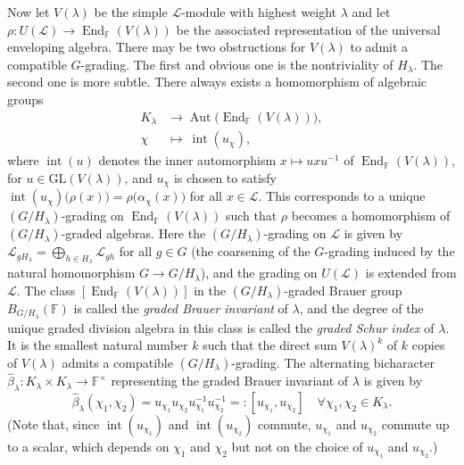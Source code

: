 \documentclass[a4paper,reqno]{amsart}
\theoremstyle{definition}
\numberwithin{theorem}{section}
\numberwithin{equation}{section}
\begin{document}
Now let $V(\lambda)$ be the simple ${\mathcal{L}}$-module with highest weight $\lambda$ and let $\rho\colon U({\mathcal{L}})\rightarrow \operatorname{\mathrm{End}}_{\mathbb{F}}(V(\lambda))$ be the associated representation of the universal enveloping algebra. There may be two obstructions for $V(\lambda)$ to admit a compatible $G$-grading. The first and obvious one is the nontriviality of $H_\lambda$. The second one is more subtle. There always exists a homomorphism of algebraic groups
\[
\begin{split}
K_\lambda&\longrightarrow \operatorname{\mathrm{Aut}}\bigl(\operatorname{\mathrm{End}}_{\mathbb{F}}(V(\lambda))\bigr),\\
\chi&\mapsto \ \operatorname{\mathrm{int}}(u_\chi),
\end{split}
\]
where $\operatorname{\mathrm{int}}(u)$ denotes the inner automorphism $x\mapsto uxu^{-1}$ of $\operatorname{\mathrm{End}}_{\mathbb{F}}(V(\lambda))$, for $u\in{\mathrm{GL}}(V(\lambda))$, and $u_\chi$ is chosen to satisfy $\operatorname{\mathrm{int}}(u_\chi)\bigl(\rho(x)\bigr)=\rho\bigl(\alpha_\chi(x)\bigr)$ for all $x\in{\mathcal{L}}$. This corresponds to a unique $(G/H_\lambda)$-grading on $\operatorname{\mathrm{End}}_{\mathbb{F}}(V(\lambda))$ such that $\rho$ becomes a homomorphism of $(G/H_\lambda)$-graded algebras. Here the $(G/H_\lambda)$-grading on ${\mathcal{L}}$ is given by ${\mathcal{L}}_{gH_\lambda}=\bigoplus_{h\in H_\lambda}{\mathcal{L}}_{gh}$ for all $g\in G$ (the coarsening of the $G$-grading induced by the natural homomorphism $G\to G/H_\lambda$), and the grading on $U({\mathcal{L}})$ is extended from ${\mathcal{L}}$.
The class $[\operatorname{\mathrm{End}}_{\mathbb{F}}(V(\lambda))]$ in the $(G/H_\lambda)$-graded Brauer group $B_{G/H_\lambda}({\mathbb{F}})$ is called the \emph{graded Brauer invariant} of $\lambda$, and the degree of the unique graded division algebra in this class is called the \emph{graded Schur index} of $\lambda$. It is the smallest natural number $k$ such that the direct sum $V(\lambda)^k$ of $k$ copies of $V(\lambda)$ admits a compatible $(G/H_\lambda)$-grading. 
The alternating bicharacter $\hat{\beta}_\lambda\colon K_\lambda\times K_\lambda\to{\mathbb{F}}^\times$ representing the graded Brauer invariant of $\lambda$ is given by
\[
\hat{\beta}_\lambda(\chi_1,\chi_2)=u_{\chi_1}u_{\chi_2}u_{\chi_1}^{-1}u_{\chi_2}^{-1}{=:} [u_{\chi_1},u_{\chi_2}]
\quad\forall \chi_1,\chi_2\in K_\lambda.
\]
(Note that, since $\operatorname{\mathrm{int}}(u_{\chi_1})$ and $\operatorname{\mathrm{int}}(u_{\chi_2})$ commute, $u_{\chi_1}$ and $u_{\chi_2}$ commute up to a scalar, which depends on $\chi_1$ and $\chi_2$ but not on the choice of $u_{\chi_1}$ and $u_{\chi_2}$.)
\end{document}
